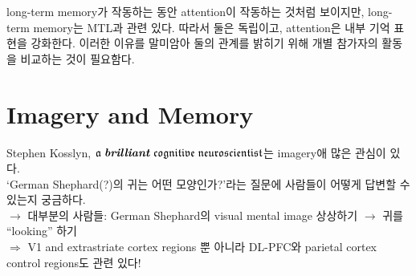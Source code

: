 \documentclass[../note.tex]{subfiles}
\begin{document}
long-term memory가 작동하는 동안 attention이 작동하는 것처럼 보이지만, long-term memory는 MTL과 관련 있다.
따라서 둘은 독립이고, attention은 내부 기억 표현을 강화한다.
이러한 이유를 말미암아 둘의 관계를 밝히기 위해 개별 참가자의 활동을 비교하는 것이 필요함다.


\section{Imagery and Memory}
\label{sec:imagery}
Stephen Kosslyn, $\mathfrak{a\;\textbf{\textit{brilliant}}\;cognitive\;neuroscientist}$는 imagery애 많은 관심이 있다.\\
`German Shephard(?)의 귀는 어떤 모양인가?'라는 질문에 사람들이 어떻게 답변할 수 있는지 궁금하다.\\
$\longrightarrow$ 대부분의 사람들: German Shephard의 visual mental image 상상하기
$\rightarrow$ 귀를 ``looking'' 하기\\
$\Longrightarrow$ V1 and extrastriate cortex regions 뿐 아니라 DL-PFC와 parietal cortex control regions도 관련 있다!
\end{document}
